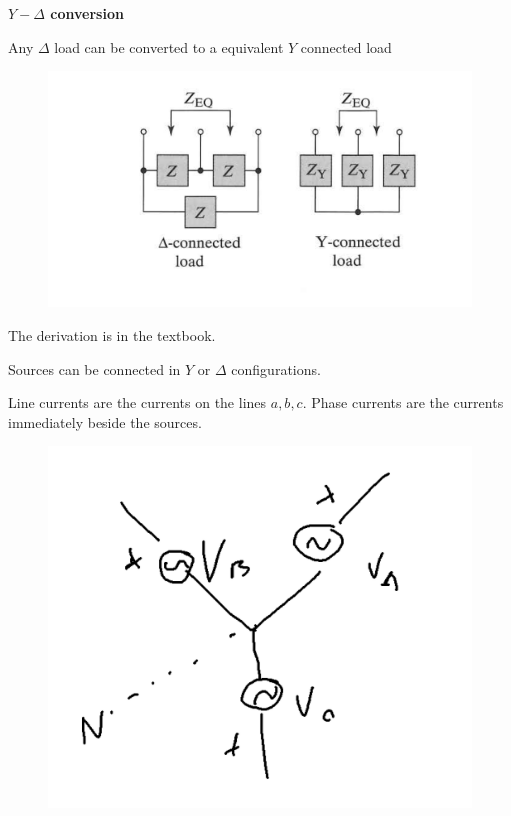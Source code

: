 \documentclass[../notes.tex]{subfiles}
\begin{document}
\begin{theorem}
	\textbf{$ Y-\Delta $ conversion}

	Any $ \Delta $ load can be converted to a equivalent $ Y $ connected load

	\begin{figure}[H]
		\centering
		\includegraphics[width=0.8\linewidth]{img/image_2022-09-19-11-28-05.png}
	\end{figure}

\end{theorem}

The derivation is in the textbook.


Sources can be connected in $ Y $ or $ \Delta $ configurations.

\begin{definition}
	Line currents are the currents on the lines $ a, b, c $. Phase currents are the currents immediately beside the sources.
\end{definition}


\begin{figure}[H]
	\centering
	\includegraphics[width=0.8\linewidth]{img/image_2022-09-19-11-37-44.png}
\end{figure}
\end{document}
